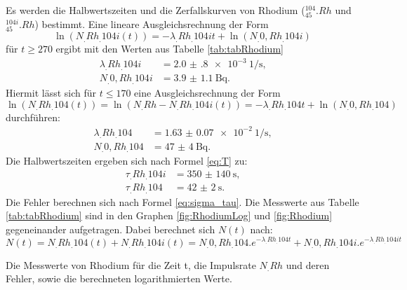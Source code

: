 Es werden die Halbwertszeiten und die Zerfallskurven von Rhodium ($^{104}_{45}.{Rh}$ und $^{104i}_{45}.{Rh}$) bestimmt.
Eine lineare Ausgleichsrechnung der Form 
\begin{equation}
\ln(N_.{Rh_.{104i}}(t))=-\lambda_.{Rh_.{104i}} t+\ln(N_.{0,Rh_.{104i}})\label{eq:Ausgleich2}
\end{equation}
für $t\geq 270$ ergibt mit den Werten aus Tabelle \ref{tab:tabRhodium}
\begin{align*}
\lambda_.{Rh_.{104i}} 	&= \SI{2.0(8)e-3}{1\per\second}\text{,}\\
N_.{0,Rh_.{104i}} 		&= \SI{3.9(11)}{\becquerel}\text{.}
\end{align*}
Hiermit lässt sich für $t\leq 170$ eine Ausgleichsrechnung der Form 
\begin{equation}
\ln(N_.{Rh_.{104}}(t))=\ln(N_.{Rh}-N_.{Rh_.{104i}}(t))=-\lambda_.{Rh_.{104}} t+\ln(N_.{0,Rh_.{104}})\label{eq:Ausgleich1}
\end{equation}
durchführen:
\begin{align*}
\lambda_.{Rh_.{104}} 	&= \SI{1.63(7)e-2}{1\per\second}\text{,}\\
N_.{0,Rh_.{104}} 		&= \SI{47(4)}{\becquerel}\text{.}
\end{align*}
Die Halbwertszeiten ergeben sich nach Formel \eqref{eq:T} zu:
\begin{align*}
\tau_.{Rh_.{104i}} 	&= \SI{350(140)}{\second}\text{,}\\
\tau_.{Rh_.{104}} &= \SI{42(2)}{\second}\text{.}
\end{align*}
Die Fehler berechnen sich nach Formel \eqref{eq:sigma_tau}. Die Messwerte aus Tabelle \ref{tab:tabRhodium} sind in den Graphen \ref{fig:RhodiumLog} und \ref{fig:Rhodium} gegeneinander aufgetragen. Dabei berechnet sich $N(t)$ nach:
\begin{equation*}
N(t)=N_.{Rh_.{104}}(t)+N_.{Rh_.{104i}}(t)=N_.{0,Rh_.{104}}.e^{-\lambda_.{Rh_.{104}} t}+N_.{0,Rh_.{104i}}.e^{-\lambda_.{Rh_.{104i}} t}
\end{equation*}

\begin{table}
	\centering
	\caption{Die Messwerte von Rhodium für die Zeit t, die Impulsrate $N_.{Rh}$ und deren Fehler, sowie die berechneten logarithmierten Werte.}
	
	\label{tab:tabRhodium}
\end{table}

\begin{table}
	\centering
	
\end{table}

